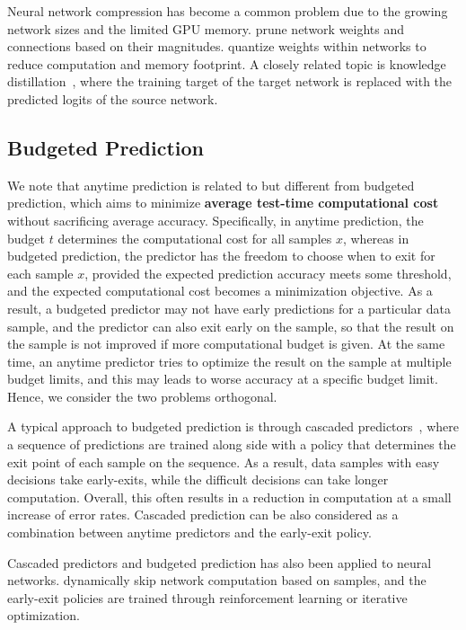 Neural network compression has become a common problem due to the growing network sizes and the 
limited GPU memory. \cite{prune_nn,slim_nn,huang2017condensenet} prune network weights and connections 
based on their magnitudes.
\cite{binary_nn,binary_nn_eccv,squeezenet} quantize weights within networks to reduce computation and memory footprint. 
A closely related topic is knowledge distillation~\cite{deepreally,distillation},
where the training target of the target network is replaced with the predicted logits of the source network.



\subsection{Budgeted Prediction}
We note that anytime prediction is related to but different from budgeted prediction,
which aims to minimize \textbf{average test-time computational cost} without sacrificing average accuracy.
Specifically, in anytime prediction, the budget $t$ determines the computational cost for all samples $x$, 
whereas in budgeted prediction, the predictor has the freedom to choose when to exit for each sample $x$,
provided the expected prediction accuracy meets some threshold, and the expected computational cost becomes a minimization
objective. As a result, a budgeted predictor may not have early predictions for a particular data sample, and 
the predictor can also exit early on the sample, so that the result on the sample is not improved if more computational budget
is given. At the same time, an anytime predictor tries to optimize the result on the sample at multiple budget limits, 
and this may leads to worse accuracy at a specific budget limit. Hence, we consider the two problems 
orthogonal. 

A typical approach to budgeted prediction is through cascaded predictors~\citep{cascade,sochman:05, brubaker:07, lefakis:10, xu:14, cai:15}, 
where a sequence of predictions are trained along side with a policy that determines the exit point of each sample on the sequence. 
As a result, data samples with easy decisions take early-exits, while the difficult decisions can take longer computation.
Overall, this often results in a reduction in computation at a small increase of error rates. 
Cascaded prediction can be also considered as a combination between anytime predictors and the early-exit policy. 

Cascaded predictors and budgeted prediction has also been applied to neural networks. 
\cite{wang2017skipnet,veit2017convolutional,adaptivenn} dynamically skip network computation based on samples, and the early-exit policies 
are trained through reinforcement learning or iterative optimization. 






